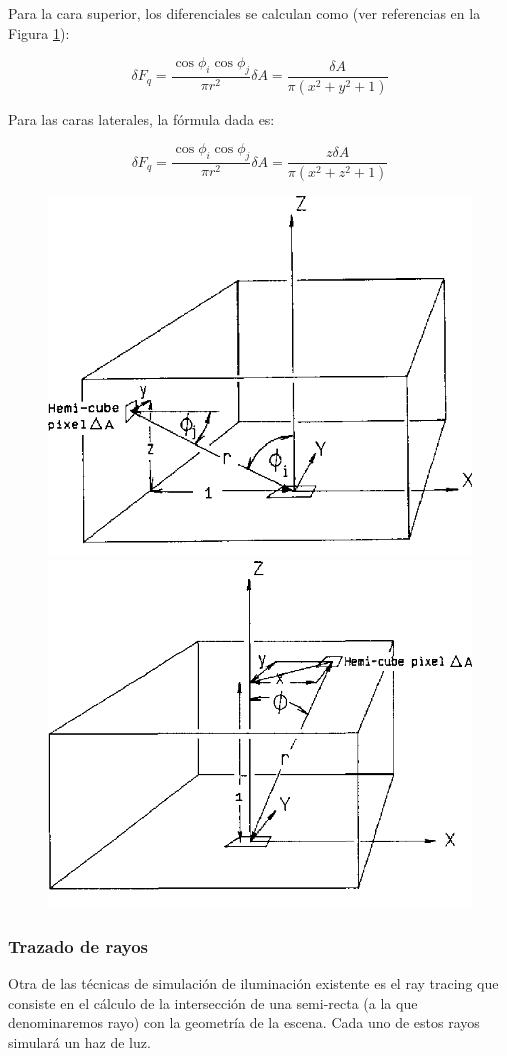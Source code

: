 Para la cara superior, los diferenciales se calculan como (ver referencias en la Figura \ref{img:deltaff}):

\begin{equation}
	\delta{F_{q}} = \frac{\cos{\phi_{i}}\cos{\phi_{j}}}{\pi{r^{2}}} \delta{A} = \frac{\delta{A}}{\pi({x^{2} + y^{2} + 1})} 
\end{equation}

Para las caras laterales, la fórmula dada es:

\begin{equation}
\delta{F_{q}} = \frac{\cos{\phi_{i}}\cos{\phi_{j}}}{\pi{r^{2}}}\delta{A} = \frac{z\delta{A}}{\pi({x^{2} + z^{2} + 1})}
\end{equation}

\begin{figure}[htbp]
	\centering
	\includegraphics[width=0.4\linewidth]{assets/hemicube1}
	\includegraphics[width=0.4\linewidth]{assets/hemicube2}
	\label{img:deltaff}
\end{figure}


\subsubsection{Trazado de rayos}
\label{sec:raytracing}

Otra de las técnicas de simulación de iluminación existente es el ray tracing que consiste en el cálculo de la intersección de una semi-recta (a la que denominaremos rayo) con la geometría de la escena. Cada uno de estos rayos simulará un haz de luz.

